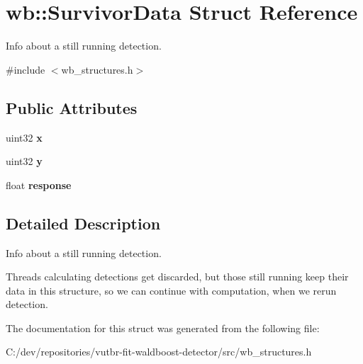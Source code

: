 \hypertarget{structwb_1_1_survivor_data}{}\section{wb\+:\+:Survivor\+Data Struct Reference}
\label{structwb_1_1_survivor_data}


Info about a still running detection.  




{\ttfamily \#include $<$wb\+\_\+structures.\+h$>$}

\subsection*{Public Attributes}
\begin{DoxyCompactItemize}
\item 
\hypertarget{structwb_1_1_survivor_data_a332b2124ef31030c0926f39af55a9813}{}uint32 {\bfseries x}\label{structwb_1_1_survivor_data_a332b2124ef31030c0926f39af55a9813}

\item 
\hypertarget{structwb_1_1_survivor_data_aae20a4b74ebf68b84d3fec67dc8870e8}{}uint32 {\bfseries y}\label{structwb_1_1_survivor_data_aae20a4b74ebf68b84d3fec67dc8870e8}

\item 
\hypertarget{structwb_1_1_survivor_data_a95128ef84007dd7e5276afc4435b86bb}{}float {\bfseries response}\label{structwb_1_1_survivor_data_a95128ef84007dd7e5276afc4435b86bb}

\end{DoxyCompactItemize}


\subsection{Detailed Description}
Info about a still running detection. 

Threads calculating detections get discarded, but those still running keep their data in this structure, so we can continue with computation, when we rerun detection. 

The documentation for this struct was generated from the following file\+:\begin{DoxyCompactItemize}
\item 
C\+:/dev/repositories/vutbr-\/fit-\/waldboost-\/detector/src/wb\+\_\+structures.\+h\end{DoxyCompactItemize}
